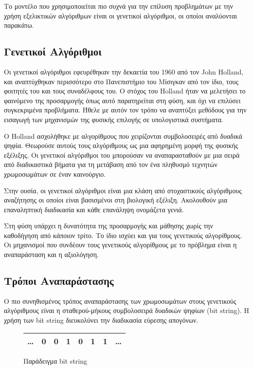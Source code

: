 Το μοντέλο που χρησιμοποιείται πιο συχνά για την επίλυση προβλημάτων με την χρήση εξελικτικών αλγόριθμων είναι οι γενετικοί αλγόριθμοι, οι οποίοι αναλύονται παρακάτω.

\subsection{Γενετικοί Αλγόριθμοι}

Οι γενετικοί αλγόριθμοι εφευρέθηκαν την δεκαετία του 1960 από τον John Holland, και αναπτύχθηκαν περισσότερο στο Πανεπιστήμιο του Μίσιγκαν από τον ίδιο, τους φοιτητές του και τους συναδέλφους του. Ο στόχος του Holland ήταν να μελετήσει το φαινόμενο της προσαρμογής όπως αυτό παρατηρείται στη φύση, και όχι να επιλύσει συγκεκριμένα προβλήματα. Ήθελε με αυτόν τον τρόπο να αναπτύξει μεθόδους για την εισαγωγή των μηχανισμών της φυσικής επιλογής σε υπολογιστικά συστήματα. \cite{Melanie1999}

O Holland ασχολήθηκε με αλγορίθμους που χειρίζονται συμβολοσειρές από δυαδικά ψηφία. Θεωρούσε αυτούς τους αλγόριθμους ως μια αφηρημένη μορφή της φυσικής εξέλιξης. Οι γενετικοί αλγόριθμοι του μπορούσαν να αναπαρασταθούν με μια σειρά από διαδικαστικά βήματα για τη μετάβαση από τον ένα πληθυσμό τεχνητών χρωμοσωμάτων σε έναν καινούργιο. \cite{Negnevitsky2005}

Στην ουσία, οι γενετικοί αλγόριθμοι είναι μια κλάση από στοχαστικούς αλγόριθμους αναζήτησης οι οποίοι είναι βασισμένοι στη βιολογική εξέλιξη. Ακολουθούν μια επαναληπτική διαδικασία και κάθε επανάληψη ονομάζετα γενιά.

Στη φύση υπάρχει η δυνατότητα της προσαρμογής και μάθησης χωρίς την καθοδήγηση από κάποιον τρίτο. Το ίδιο ισχύει και για τους γενετικούς αλγορίθμους. Οι μηχανισμοί που συνδέουν τους γενετικούς αλγορίθμους με το πρόβλημα είναι η αναπαράσταση και η αξιολόγηση.

\subsection{Τρόποι Αναπαράστασης}

Ο πιο συνηθισμένος τρόπος αναπαράστασης των χρωμοσωμάτων στους γενετικούς αλγόριθμους είναι η σταθερού-μήκους συμβολοσειρά δυαδικών ψηφίων (bit string). Η χρήση των bit string διευκολύνει την διαδικασία εύρεσης απογόνων.

\begin{figure}[!t]
    \renewcommand{\arraystretch}{1.3}
    \label{fig_bit_string}
    \centering
    \begin{tabular}{c|c|c|c|c|c|c|c}
        \hline
        \ldots & 0 & 0 & 1 & 0 & 1 & 1 & \ldots\\
        \hline
    \end{tabular}
    \caption{Παράδειγμα bit string}
\end{figure}

